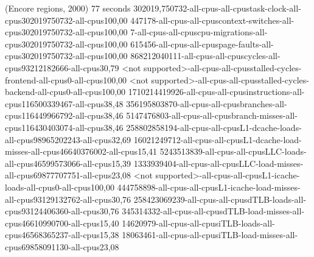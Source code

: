 (Encore regions, 2000)
77 seconds
302019,750732-all-cpus-all-cpustask-clock-all-cpus302019750732-all-cpus100,00
447178-all-cpus-all-cpuscontext-switches-all-cpus302019750732-all-cpus100,00
7-all-cpus-all-cpuscpu-migrations-all-cpus302019750732-all-cpus100,00
615456-all-cpus-all-cpuspage-faults-all-cpus302019750732-all-cpus100,00
868212040111-all-cpus-all-cpuscycles-all-cpus93212182666-all-cpus30,79
<not supported>-all-cpus-all-cpusstalled-cycles-frontend-all-cpus0-all-cpus100,00
<not supported>-all-cpus-all-cpusstalled-cycles-backend-all-cpus0-all-cpus100,00
1710214419926-all-cpus-all-cpusinstructions-all-cpus116500339467-all-cpus38,48
356195803870-all-cpus-all-cpusbranches-all-cpus116449966792-all-cpus38,46
5147476803-all-cpus-all-cpusbranch-misses-all-cpus116430403074-all-cpus38,46
258802858194-all-cpus-all-cpusL1-dcache-loads-all-cpus98965202243-all-cpus32,69
16021249712-all-cpus-all-cpusL1-dcache-load-misses-all-cpus46640376002-all-cpus15,41
5243513839-all-cpus-all-cpusLLC-loads-all-cpus46599573066-all-cpus15,39
1333939404-all-cpus-all-cpusLLC-load-misses-all-cpus69877707751-all-cpus23,08
<not supported>-all-cpus-all-cpusL1-icache-loads-all-cpus0-all-cpus100,00
444758898-all-cpus-all-cpusL1-icache-load-misses-all-cpus93129132762-all-cpus30,76
258423069239-all-cpus-all-cpusdTLB-loads-all-cpus93124406360-all-cpus30,76
345314332-all-cpus-all-cpusdTLB-load-misses-all-cpus46610990700-all-cpus15,40
14620979-all-cpus-all-cpusiTLB-loads-all-cpus46568365237-all-cpus15,38
18063461-all-cpus-all-cpusiTLB-load-misses-all-cpus69858091130-all-cpus23,08
